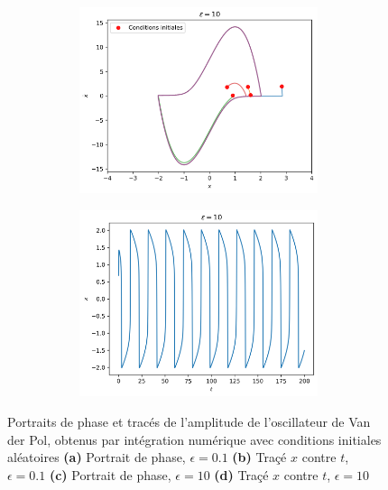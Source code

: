 \begin{figure}[t]
\begin{subfigure}[b]{0.9\textwidth}
    \end{subfigure}
    \centering
    \begin{subfigure}[b]{0.9\textwidth}
        \begin{subfigure}[b]{.47\textwidth}
            \includegraphics[width=\textwidth]{images/vdp/vanderpol_large.png}%
            \caption{}
        \end{subfigure}
        \hfill
        \begin{subfigure}[b]{.47\textwidth}
            \includegraphics[width=\textwidth]{images/vdp/vanderpol_large_x.png}%
            \caption{}
        \end{subfigure}
    \end{subfigure}
    \caption{Portraits de phase et tracés de l'amplitude de l'oscillateur de Van der Pol, obtenus par intégration numérique avec conditions initiales aléatoires \textbf{(a)} Portrait de phase, $\epsilon=0.1$ \textbf{(b)} Traçé $x$ contre $t$, $\epsilon=0.1$ \textbf{(c)} Portrait de phase, $\epsilon=10$ \textbf{(d)} Traçé $x$ contre $t$, $\epsilon=10$}\label{fig:portrait_vdp}
\end{figure}
